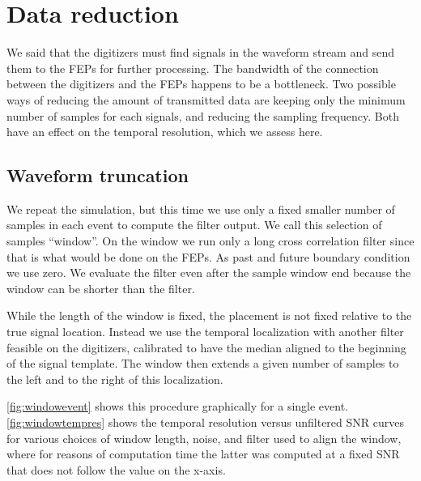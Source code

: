 \section{Data reduction}

We said that the digitizers must find signals in the waveform stream and send
them to the FEPs for further processing. The bandwidth of the connection
between the digitizers and the FEPs happens to be a bottleneck. Two possible
ways of reducing the amount of transmitted data are keeping only the minimum
number of samples for each signals, and reducing the sampling frequency. Both
have an effect on the temporal resolution, which we assess here.

\subsection{Waveform truncation}

We repeat the simulation, but this time we use only a fixed smaller number of
samples in each event to compute the filter output. We call this selection of
samples ``window''. On the window we run only a long cross correlation filter
since that is what would be done on the FEPs. As past and future boundary
condition we use zero. We evaluate the filter even after the sample window end
because the window can be shorter than the filter.

While the length of the window is fixed, the placement is not fixed relative to
the true signal location. Instead we use the temporal localization with another
filter feasible on the digitizers, calibrated to have the median aligned to the
beginning of the signal template. The window then extends a given number of
samples to the left and to the right of this localization.

\autoref{fig:windowevent} shows this procedure graphically for a single
event. \autoref{fig:windowtempres} shows the temporal resolution versus
unfiltered SNR curves for various choices of window length, noise, and filter
used to align the window, where for reasons of computation time the latter was
computed at a fixed SNR that does not follow the value on the x-axis.

\begin{figure}
    
    

\end{figure}

